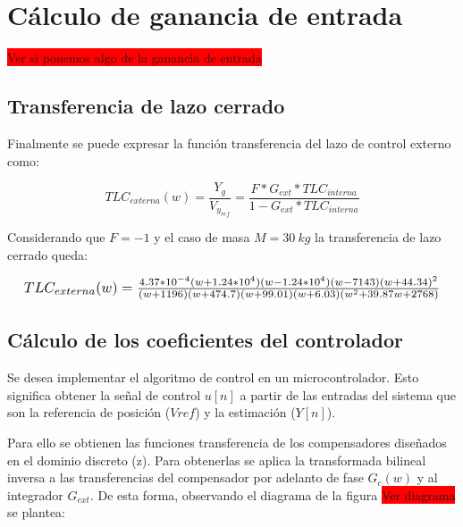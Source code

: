 \section{Cálculo de ganancia de entrada}

\colorbox{red}{Ver si ponemos algo de la ganancia de entrada}


\subsection{Transferencia de lazo cerrado}

Finalmente se puede expresar la función transferencia del lazo de control externo como:

\begin{equation}
	TLC_{externa}(w)=\frac{Y_g}{V_{y_{ref}}}=\frac{F*G_{ext}*TLC_{interna}}{1-G_{ext}*TLC_{interna}}
\end{equation}

Considerando que $F=-1$ y el caso de masa $M=30\:kg$ la transferencia de lazo cerrado queda:

\begin{equation*}
	\resizebox{.99\hsize}{!}
	{
		$
		TLC_{externa}(w)=\frac{4.37*10^{-4} (w+1.24*10^{4}) (w-1.24*10^{4}) (w-7143) (w+44.34)^2}{(w+1196) (w+474.7) (w+99.01) (w+6.03) (w^2 + 39.87w + 2768)}
		$
	}
\end{equation*}



\subsection{Cálculo de los coeficientes del controlador}


Se desea implementar el algoritmo de control en un microcontrolador. Esto significa obtener la señal de control $u[n]$ a partir de las entradas del sistema que son la referencia de posición ($Vref$) y la estimación ($Y[n]$). 

Para ello se obtienen las funciones transferencia de los compensadores diseñados en el dominio discreto (z). Para obtenerlas se aplica la transformada bilineal inversa a las transferencias del compensador por adelanto de fase $G_c(w)$ y al integrador $G_{ext}$. De esta forma, observando el diagrama de la figura \colorbox{red}{Ver diagrama} se plantea:

